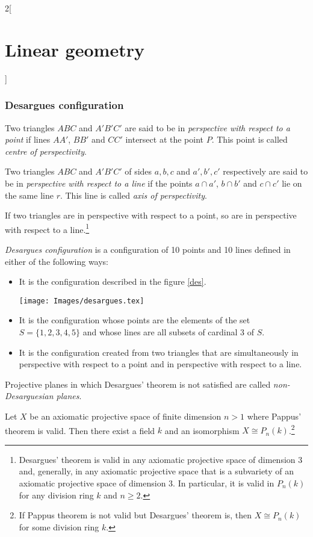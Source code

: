\documentclass[class=article,10pt,crop=false]{standalone}
\begin{document}
\begin{multicols}{2}[\section{Linear geometry}]
\subsubsection*{Desargues configuration}
\begin{definition}
Two triangles $ABC$ and $A'B'C'$ are said to be in \textit{perspective with respect to a point} if lines $AA'$, $BB'$ and $CC'$ intersect at the point $P$. This point is called \textit{centre of perspectivity}.
\end{definition}
\begin{definition}
Two triangles $ABC$ and $A'B'C'$ of sides $a,b,c$ and $a',b',c'$ respectively are said to be in \textit{perspective with respect to a line} if the points $a\cap a'$, $b\cap b'$ and $c\cap c'$ lie on the same line $r$. This line is called \textit{axis of perspectivity}.
\end{definition}
\begin{theorem}
If two triangles are in perspective with respect to a point, so are in perspective with respect to a line.\footnote{Desargues' theorem is valid in any axiomatic projective space of dimension 3 and, generally, in any axiomatic projective space that is a subvariety of an axiomatic projective space of dimension 3. In particular, it is valid in $P_n(k)$ for any division ring $k$ and $n\geq2$.}
\end{theorem}
\begin{definition}
\textit{Desargues configuration} is a configuration of 10 points and 10 lines defined in either of the following ways:
\begin{itemize}
    \item It is the configuration described in the figure \ref{des}.\par
    \begin{minipage}{\linewidth} 
        \centering
        \texttt{[image: Images/desargues.tex]} 
        \label{des}
    \end{minipage}
    \item It is the configuration whose points are the elements of the set $S=\{1,2,3,4,5\}$ and whose lines are all subsets of cardinal 3 of $S$.
    \item It is the configuration created from two triangles that are simultaneously in perspective with respect to a point and in perspective with respect to a line. 
\end{itemize}
\end{definition}
\begin{definition}
Projective planes in which Desargues' theorem is not satisfied are called \textit{non-Desarguesian planes}.
\end{definition}
\begin{theorem}
Let $X$ be an axiomatic projective space of finite dimension $n>1$ where Pappus' theorem is valid. Then there exist a field $k$ and an isomorphism $X\cong P_n(k)$.\footnote{If Pappus theorem is not valid but Desargues' theorem is, then $X\cong P_n(k)$ for some division ring $k$.}
\end{theorem}

\end{multicols}
\end{document}
